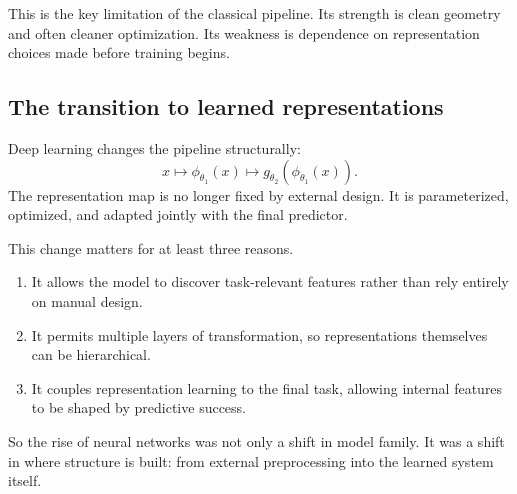 This is the key limitation of the classical pipeline. Its strength is clean geometry and often cleaner optimization. Its weakness is dependence on representation choices made before training begins.


\subsection*{The transition to learned representations}

Deep learning changes the pipeline structurally:
\[
x \longmapsto \phi_{\theta_1}(x) \longmapsto g_{\theta_2}(\phi_{\theta_1}(x)).
\]
The representation map is no longer fixed by external design. It is parameterized, optimized, and adapted jointly with the final predictor.

This change matters for at least three reasons.

\begin{enumerate}
    \item It allows the model to discover task-relevant features rather than rely entirely on manual design.
    \item It permits multiple layers of transformation, so representations themselves can be hierarchical.
    \item It couples representation learning to the final task, allowing internal features to be shaped by predictive success.
\end{enumerate}

So the rise of neural networks was not only a shift in model family. It was a shift in where structure is built: from external preprocessing into the learned system itself.

